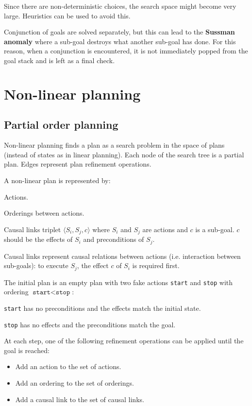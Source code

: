 Since there are non-deterministic choices, the search space might become very large.
Heuristics can be used to avoid this.

Conjunction of goals are solved separately, but this can lead to the  \textbf{Sussman anomaly} 
where a sub-goal destroys what another sub-goal has done.
For this reason, when a conjunction is encountered, it is not immediately popped from the goal stack
and is left as a final check.



\section{Non-linear planning}


\subsection{Partial order planning}

Non-linear planning finds a plan as a search problem in the space of plans (instead of states as in linear planning).
Each node of the search tree is a partial plan. Edges represent plan refinement operations.

A non-linear plan is represented by:
\begin{descriptionlist}
    \item[Actions{\normalfont.}] 
    \item[Orderings] 
        between actions.
    \item[Causal links] 
        triplet $\langle S_i, S_j, c \rangle$ where $S_i$ and $S_j$ are actions and $c$ is a sub-goal.
        $c$ should be the effects of $S_i$ and preconditions of $S_j$.

        Causal links represent causal relations between actions (i.e. interaction between sub-goals): 
        to execute $S_j$, the effect $c$ of $S_i$ is required first.
\end{descriptionlist}

The initial plan is an empty plan with two fake actions \texttt{start} and \texttt{stop} 
with ordering $\texttt{start} < \texttt{stop}$:
\begin{descriptionlist}
    \item[\texttt{start}] has no preconditions and the effects match the initial state.
    \item[\texttt{stop}] has no effects and the preconditions match the goal.
\end{descriptionlist}
At each step, one of the following refinement operations can be applied until the goal is reached:
\begin{itemize}
    \item Add an action to the set of actions.
    \item Add an ordering to the set of orderings.
    \item Add a causal link to the set of causal links.
\end{itemize}

